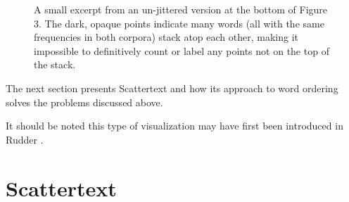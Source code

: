 \documentclass[11pt]{article}
\begin{document}
\vspace{-.25cm}
\begin{figure}
\caption{A small excerpt from an un-jittered version at the bottom of Figure 3.  The dark, opaque points indicate many words (all with the same frequencies in both corpora) stack atop each other, making it impossible to definitively count or label any points not on the top of the stack.}
\label{nojitterfig}
\end{figure}
\vspace{-.5cm}

The next section presents Scattertext and how its approach to word ordering solves the problems discussed above.

It should be noted this type of visualization may have first been introduced in Rudder .

\section{Scattertext}
\label{scattertext}
\end{document}
